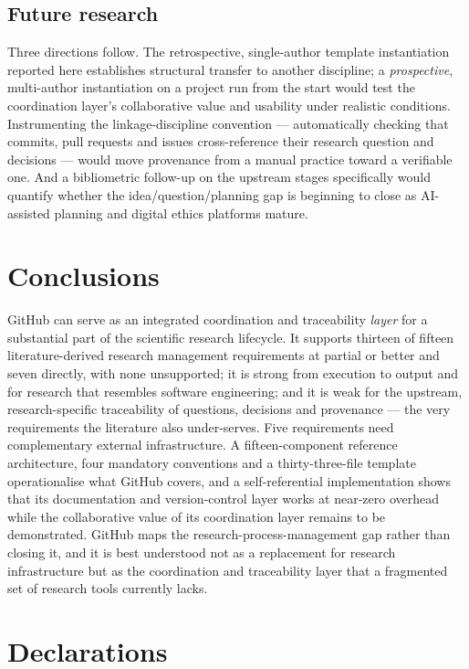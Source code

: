\documentclass[pdflatex,sn-mathphys-num]{sn-jnl}%
\begin{document}
\subsection{Future research}\label{sec:d-future}

Three directions follow. The retrospective, single-author template instantiation reported here establishes structural transfer to another discipline; a \emph{prospective}, multi-author instantiation on a project run from the start would test the coordination layer's collaborative value and usability under realistic conditions. Instrumenting the linkage-discipline convention --- automatically checking that commits, pull requests and issues cross-reference their research question and decisions --- would move provenance from a manual practice toward a verifiable one. And a bibliometric follow-up on the upstream stages specifically would quantify whether the idea/question/planning gap is beginning to close as AI-assisted planning and digital ethics platforms mature.


\section{Conclusions}\label{sec:conclusions}

GitHub can serve as an integrated coordination and traceability \emph{layer} for a substantial part of the scientific research lifecycle. It supports thirteen of fifteen literature-derived research management requirements at partial or better and seven directly, with none unsupported; it is strong from execution to output and for research that resembles software engineering; and it is weak for the upstream, research-specific traceability of questions, decisions and provenance --- the very requirements the literature also under-serves. Five requirements need complementary external infrastructure. A fifteen-component reference architecture, four mandatory conventions and a thirty-three-file template operationalise what GitHub covers, and a self-referential implementation shows that its documentation and version-control layer works at near-zero overhead while the collaborative value of its coordination layer remains to be demonstrated. GitHub maps the research-process-management gap rather than closing it, and it is best understood not as a replacement for research infrastructure but as the coordination and traceability layer that a fragmented set of research tools currently lacks.


\section*{Declarations}
\end{document}
